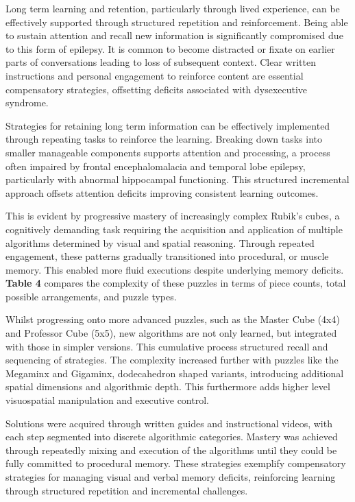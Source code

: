 \documentclass{article}
\begin{document}
Long term learning and retention, particularly through lived experience, can be effectively supported through structured repetition and reinforcement. Being able to sustain attention and recall new information is significantly compromised due to this form of epilepsy. It is common to become distracted or fixate on earlier parts of conversations leading to loss of subsequent context. Clear written instructions and personal engagement to reinforce content are essential compensatory strategies, offsetting deficits associated with dysexecutive syndrome.

Strategies for retaining long term information can be effectively implemented through repeating tasks to reinforce the learning. Breaking down tasks into smaller manageable components supports attention and processing, a process often impaired by frontal encephalomalacia and temporal lobe epilepsy, particularly with abnormal hippocampal functioning. This structured incremental approach offsets attention deficits improving consistent learning outcomes.

This is evident by progressive mastery of increasingly complex Rubik’s cubes, a cognitively demanding task requiring the acquisition and application of multiple algorithms determined by visual and spatial reasoning. Through repeated engagement, these patterns gradually transitioned into procedural, or muscle memory. This enabled more fluid executions despite underlying memory deficits. \textbf{Table 4} compares the complexity of these puzzles in terms of piece counts, total possible arrangements, and puzzle types. 

Whilst progressing onto more advanced puzzles, such as the Master Cube (4x4) and Professor Cube (5x5), new algorithms are not only learned, but integrated with those in simpler versions. This cumulative process structured recall and sequencing of strategies. The complexity increased further with puzzles like the Megaminx and Gigaminx, dodecahedron shaped variants, introducing additional spatial dimensions and algorithmic depth. This furthermore adds higher level visuospatial manipulation and executive control.

Solutions were acquired through written guides and instructional videos, with each step segmented into discrete algorithmic categories. Mastery was achieved through repeatedly mixing and execution of the algorithms until they could be fully committed to procedural memory. These strategies exemplify compensatory strategies for managing visual and verbal memory deficits, reinforcing learning through structured repetition and incremental challenges.
\end{document}

